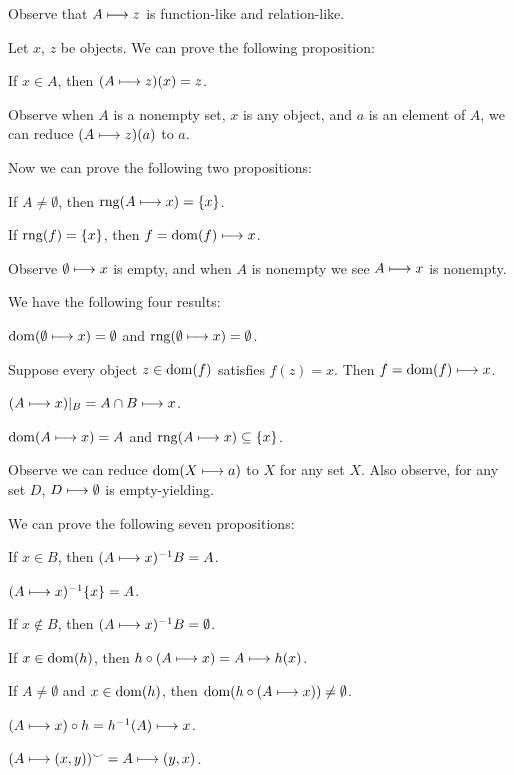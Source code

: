 \documentclass{article}
\begin{document}
Observe that $A\longmapsto z$ is function-like and relation-like.

Let $x$, $z$ be objects. We can prove the following proposition:
\begin{thm}
\item\label{funcop1:7} If $x\in A$, then $(A\longmapsto z)(x)=z$.
\end{thm}
Observe when $A$ is a nonempty set, $x$ is any object, and $a$ is an
element of $A$, we can reduce $(A\longmapsto z)(a)$ to $a$.

Now we can prove the following two propositions:
\begin{thm}
\item\label{funcop1:8} If $A\neq\emptyset$, then $\operatorname{rng}(A\longmapsto x)=\{x\}$.
\item\label{funcop1:9} If $\operatorname{rng}(f)=\{x\}$,
  then $f=\operatorname{dom}(f)\longmapsto x$.
\end{thm}

Observe $\emptyset\longmapsto x$ is empty, and when $A$ is nonempty we
see $A\longmapsto x$ is nonempty.

We have the following four results:
\begin{thm}
\item\label{funcop1:10} $\operatorname{dom}(\emptyset\longmapsto x)=\emptyset$
  and $\operatorname{rng}(\emptyset\longmapsto x)=\emptyset$.
\item\label{funcop1:11} Suppose every object $z\in\operatorname{dom}(f)$ satisfies $f(z)=x$.
  Then $f=\operatorname{dom}(f)\longmapsto x$.
\item\label{funcop1:12} $(A\longmapsto x)|_{B}=A\cap B\longmapsto x$.
\item\label{funcop1:13} $\operatorname{dom}(A\longmapsto x)=A$ and
  $\operatorname{rng}(A\longmapsto x)\subseteq\{x\}$.
\end{thm}

Observe we can reduce $\operatorname{dom}(X\longmapsto a)$ to $X$ for any set $X$.
Also observe, for any set $D$, $D\longmapsto\emptyset$ is empty-yielding.

We can prove the following seven propositions:
\begin{thm}
\item\label{funcop1:14} If $x\in B$, then $(A\longmapsto x)^{-1}B=A$.
\item\label{funcop1:15} $(A\longmapsto x)^{-1}\{x\}=A$.
\item\label{funcop1:16} If $x\notin B$, then $(A\longmapsto x)^{-1}B=\emptyset$.
\item\label{funcop1:17} If $x\in\operatorname{dom}(h)$,
  then $h\circ(A\longmapsto x)=A\longmapsto h(x)$.
\item\label{funcop1:18} If $A\neq\emptyset$ and $x\in\operatorname{dom}(h)$,
  then $\operatorname{dom}(h\circ(A\longmapsto x))\neq\emptyset$.
\item\label{funcop1:19} $(A\longmapsto x)\circ h=h^{-1}(A)\longmapsto x$.
\item\label{funcop1:20} $(A\longmapsto(x,y))^{\smile}=A\longmapsto(y,x)$.
\end{thm}
\end{document}
